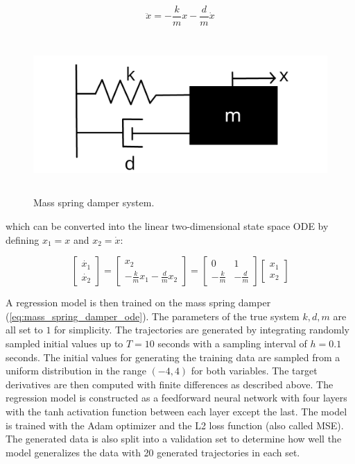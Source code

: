 \documentclass[12pt,a4paper]{book}
\begin{document}
\begin{equation}
    \ddot{x} = - \frac{k}{m} x - \frac{d}{m} \dot{x}
    \label{eq:mass_spring_damper_ode_secondorder}
\end{equation}

\begin{figure}[H]
    \centering
    \includegraphics[height=6cm]{figs/massspringdamper.png}
    \caption{Mass spring damper system.}
    \label{fig:massspring}
\end{figure}

\noindent which can be converted into the linear two-dimensional state space ODE by defining $x_1 = x$ and $x_2 = \dot{x}$:

\begin{equation}
    \begin{bmatrix} \dot{x_1} \\ \dot{x_2} \end{bmatrix}
    = \begin{bmatrix} x_2 \\ - \frac{k}{m} x_1 - \frac{d}{m} x_2 \end{bmatrix}
    = \begin{bmatrix} 0 & 1 \\ - \frac{k}{m} & - \frac{d}{m} \end{bmatrix} \begin{bmatrix} x_1 \\ x_2 \end{bmatrix}
    \label{eq:mass_spring_damper_ode}
\end{equation}

A regression model is then trained on the mass spring damper (\ref{eq:mass_spring_damper_ode}). The parameters of the true system $k, d, m$ are all set to $1$ for simplicity. The trajectories are generated by integrating randomly sampled initial values up to $T = 10$ seconds with a sampling interval of $h = 0.1$ seconds. The initial values for generating the training data are sampled from a uniform distribution in the range $(-4, 4)$ for both variables. The target derivatives are then computed with finite differences as described above. The regression model is constructed as a feedforward neural network with four layers with the tanh activation function between each layer except the last. The model is trained with the Adam optimizer \citep{kingma2017adam} and the L2 loss function (also called MSE). The generated data is also split into a validation set to determine how well the model generalizes the data with 20 generated trajectories in each set.
\end{document}

